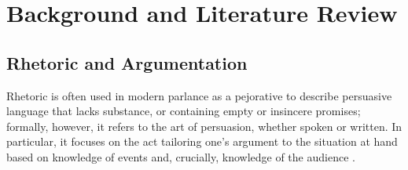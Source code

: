 \chapter{Background and Literature Review}
\label{background}


\section{Rhetoric and Argumentation}
\label{background:rhetoric}
Rhetoric is often used in modern parlance as a pejorative to describe persuasive language that lacks substance, or containing empty or insincere promises; formally, however, it refers to the art of persuasion, whether spoken or written. In particular, it focuses on the act tailoring one's argument to the situation at hand based on knowledge of events and, crucially, knowledge of the audience \citep{Corbett1999}.

